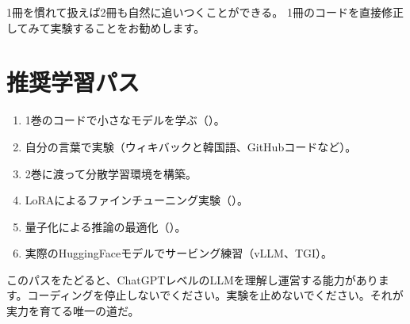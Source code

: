 1冊を慣れて扱えば2冊も自然に追いつくことができる。 1冊のコードを直接修正してみて実験することをお勧めします。

\section{推奨学習パス}

\begin{enumerate}
\item 1巻のコードで小さなモデルを学ぶ（）。
\item 自分の言葉で実験（ウィキバックと韓国語、GitHubコードなど）。
\item 2巻に渡って分散学習環境を構築。
\item LoRAによるファインチューニング実験（）。
\item 量子化による推論の最適化（）。
\item 実際のHuggingFaceモデルでサービング練習（vLLM、TGI）。
\end{enumerate}

このパスをたどると、ChatGPTレベルのLLMを理解し運営する能力があります。コーディングを停止しないでください。実験を止めないでください。それが実力を育てる唯一の道だ。
